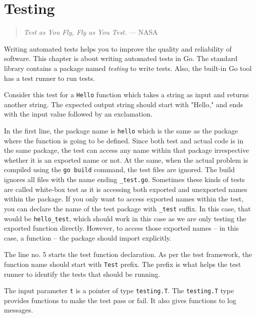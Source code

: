 \cleardoublepage
{}
\chapter{Testing}

\begin{quote}
\textit{Test as You Fly, Fly as You Test.} --- NASA
\end{quote}

Writing automated tests helps you to improve the quality and
reliability of software.  This chapter is about writing automated
tests in Go.  The standard library contains a package
named \textit{testing} to write tests.  Also, the built-in
Go tool has a test runner to run tests.

Consider this test for a \texttt{Hello} function which takes a string
as input and returns another string.  The expected output string
should start with "Hello," and ends with the input value followed by
an exclamation.



In the first line, the package name is \texttt{hello} which is the
same as the package where the function is going to be defined.  Since
both test and actual code is in the same package, the test can access
any name within that package irrespective whether it is an exported
name or not.  At the same, when the actual problem is compiled using
the \texttt{go build} command, the test files are ignored.  The build
ignores all files with the name ending \texttt{\_test.go}.  Sometimes
these kinds of tests are called white-box test as it is accessing both
exported and unexported names within the package.  If you only want to
access exported names within the test, you can declare the name of the
test package with \texttt{\_test} suffix.  In this case, that would
be \texttt{hello\_test}, which should work in this case as we are only
testing the exported function directly.  However, to access those
exported names -- in this case, a function -- the package should
import explicitly.

The line no. 5 starts the test function declaration.  As per the test
framework, the function name should start with \texttt{Test} prefix.
The prefix is what helps the test runner to identify the tests that
should be running.

The input parameter \texttt{t} is a pointer of
type \texttt{testing.T}. The \texttt{testing.T} type provides
functions to make the test pass or fail.  It also gives functions to
log messages.

